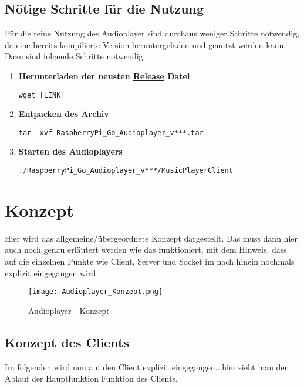 \subsection{Nötige Schritte für die Nutzung}
Für die reine Nutzung des Audioplayer sind durchaus weniger Schritte notwendig, da eine bereits kompilierte Version heruntergeladen und genutzt werden kann.
Dazu sind folgende Schritte notwendig:
\begin{enumerate}
\item \textbf{Herunterladen der neusten \href{https://github.com/alexanderklapdor/RaspberryPi_Go_Audioplayer/releases}{Release} Datei}  \\
\begin{lstlisting}
wget [LINK]
\end{lstlisting}

\item \textbf{Entpacken des Archiv} \\
\begin{lstlisting}
tar -xvf RaspberryPi_Go_Audioplayer_v***.tar
\end{lstlisting}

\item \textbf{Starten des Audioplayers} \\
\begin{lstlisting}
./RaspberryPi_Go_Audioplayer_v***/MusicPlayerClient
\end{lstlisting}
\end{enumerate}

\section{Konzept}
Hier wird das allgemeine/übergeordnete Konzept dargestellt. Das muss dann hier auch noch genau erläutert werden wie das funktioniert, mit dem Hinweis, dass auf die einzelnen Punkte wie Client, Server und Socket im nach hinein nochmals explizit eingegangen wird
\begin{figure}[h]
	\centering
	\texttt{[image: Audioplayer\_Konzept.png]}
	\caption{Audioplayer - Konzept}
	\label{img:grafik-RaspberryPi3}
\end{figure}
\newline

\subsection{Konzept des Clients}
Im folgenden wird nun auf den Client explizit eingegangen...hier sieht man den Ablauf der Hauptfunktion Funktion des Clients.

